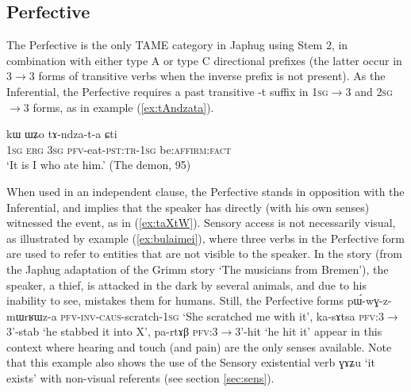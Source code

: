 \documentclass[oldfontcommands,oneside,a4paper,11pt]{article}
\newcommand{\ipa}[1]{{\phon \mbox{#1}}} %
\newcommand{\refb}[1]{(\ref{#1})}
\begin{document}
\subsection{Perfective}  \label{sec:pfv}
The Perfective is the only TAME category in Japhug using Stem 2, in combination with either type A or type C directional prefixes (the latter occur in 3$\rightarrow$3 forms of transitive verbs when the inverse prefix is not present). As the Inferential, the Perfective requires a past transitive \ipa{-t} suffix in  \textsc{1sg}$\rightarrow$3 and \textsc{2sg}$\rightarrow$3 forms, as in example \refb{ex:tAndzata}.

\begin{exe}
\ex \label{ex:tAndzata}
\gll \ipa{aʑo} 	\ipa{kɯ} 	\ipa{ɯʑo} 	\ipa{tɤ-ndza-t-a} 	\ipa{ɕti} \\
\textsc{1sg} \textsc{erg} \textsc{3sg} \textsc{pfv}-eat-\textsc{pst:tr-1sg} be:\textsc{affirm:fact} \\
\glt `It is I who ate him.' (The demon, 95)
\end{exe}

When used in an independent clause,  the Perfective stands in opposition with the Inferential, and implies that the speaker has directly (with his own senses) witnessed the event, as in  \refb{ex:taXtW}. Sensory access is not necessarily visual, as illustrated by example \refb{ex:bulaimei}, where three verbs in the Perfective form are used to refer to entities that are not visible to the speaker. In the story (from the Japhug adaptation of the Grimm story `The musicians from Bremen'), the speaker, a thief, is attacked in the dark by several animals, and due to his inability to see, mistakes them for humans. Still, the Perfective forms \ipa{pɯ́-wɣ-z-mɯrʁɯz-a} \textsc{pfv-inv-caus}-scratch-\textsc{1sg} `She scratched me with it', \ipa{ka-sɤtsa} \textsc{pfv}:3$\rightarrow$3'-stab `he stabbed it into X', \ipa{pa-rtɤβ} \textsc{pfv}:3$\rightarrow$3'-hit `he hit it' appear in this context where hearing and touch (and pain) are the only senses available. Note that this example also shows the use of the Sensory existential verb \ipa{ɣɤʑu} `it exists' with non-visual referents (see section \ref{sec:sens}).
\end{document}
